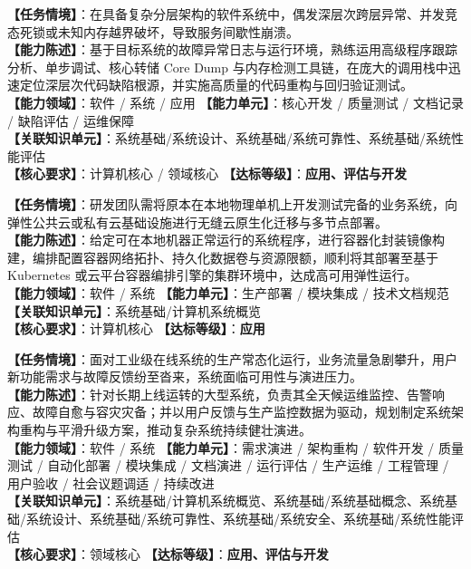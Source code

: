 \begin{taskbox}[任务 7：基于深度工具链排查并修复分层系统软件缺陷]
\textbf{【任务情境】}：在具备复杂分层架构的软件系统中，偶发深层次跨层异常、并发竞态死锁或未知内存越界破坏，导致服务间歇性崩溃。\\
\textbf{【能力陈述】}：基于目标系统的故障异常日志与运行环境，熟练运用高级程序跟踪分析、单步调试、核心转储 Core Dump 与内存检测工具链，在庞大的调用栈中迅速定位深层次代码缺陷根源，并实施高质量的代码重构与回归验证测试。\\
\textbf{【能力领域】}：软件 / 系统 / 应用 \quad \textbf{【能力单元】}：核心开发 / 质量测试 / 文档记录 / 缺陷评估 / 运维保障\\
\textbf{【关联知识单元】}：系统基础/系统设计、系统基础/系统可靠性、系统基础/系统性能评估\\
\textbf{【核心要求】}：计算机核心 / 领域核心 \quad \textbf{【达标等级】}：\textbf{应用、评估与开发}
\end{taskbox}

\begin{taskbox}[任务 8：将本地系统平滑部署至现代云原生环境]
\textbf{【任务情境】}：研发团队需将原本在本地物理单机上开发测试完备的业务系统，向弹性公共云或私有云基础设施进行无缝云原生化迁移与多节点部署。\\
\textbf{【能力陈述】}：给定可在本地机器正常运行的系统程序，进行容器化封装镜像构建，编排配置容器网络拓扑、持久化数据卷与资源限额，顺利将其部署至基于 Kubernetes 或云平台容器编排引擎的集群环境中，达成高可用弹性运行。\\
\textbf{【能力领域】}：软件 / 系统 \quad \textbf{【能力单元】}：生产部署 / 模块集成 / 技术文档规范\\
\textbf{【关联知识单元】}：系统基础/计算机系统概览\\
\textbf{【核心要求】}：计算机核心 \quad \textbf{【达标等级】}：\textbf{应用}
\end{taskbox}

\begin{taskbox}[任务 9：大型系统的日常高可用运维与架构持续演进]
\textbf{【任务情境】}：面对工业级在线系统的生产常态化运行，业务流量急剧攀升，用户新功能需求与故障反馈纷至沓来，系统面临可用性与演进压力。\\
\textbf{【能力陈述】}：针对长期上线运转的大型系统，负责其全天候运维监控、告警响应、故障自愈与容灾灾备；并以用户反馈与生产监控数据为驱动，规划制定系统架构重构与平滑升级方案，推动复杂系统持续健壮演进。\\
\textbf{【能力领域】}：软件 / 系统 \quad \textbf{【能力单元】}：需求演进 / 架构重构 / 软件开发 / 质量测试 / 自动化部署 / 模块集成 / 文档演进 / 运行评估 / 生产运维 / 工程管理 / 用户验收 / 社会议题调适 / 持续改进\\
\textbf{【关联知识单元】}：系统基础/计算机系统概览、系统基础/系统基础概念、系统基础/系统设计、系统基础/系统可靠性、系统基础/系统安全、系统基础/系统性能评估\\
\textbf{【核心要求】}：领域核心 \quad \textbf{【达标等级】}：\textbf{应用、评估与开发}
\end{taskbox}

